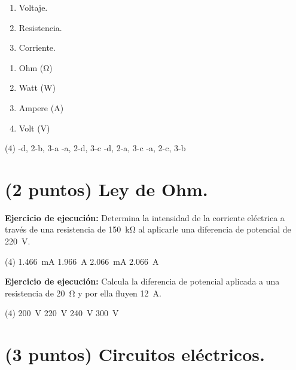 \documentclass[12pt, letter]{exam}
\begin{document}
\begin{questions}
    \begin{minipage}[t]{0.4\linewidth}
        \begin{enumerate}[label=\arabic*)]
            \item Voltaje.
            \item Resistencia.
            \item Corriente.
        \end{enumerate}
    \end{minipage}
    \begin{minipage}[t]{0.4\linewidth}
        \begin{enumerate}[label=\alph*)]
            \item Ohm (\unit{\ohm})
            \item Watt (\unit{\watt})
            \item Ampere (\unit{\ampere})
            \item Volt (\unit{\volt})
        \end{enumerate}
    \end{minipage}
    \begin{tasks}(4)
        -d, 2-b, 3-a
        -a, 2-d, 3-c
        -d, 2-a, 3-c
        -a, 2-c, 3-b
    \end{tasks}

    \section{(2 puntos) Ley de Ohm.}

    \question \label{Ejercicio_10} \label{Problema_02} \textbf{Ejercicio de ejecución: } Determina la intensidad de la corriente eléctrica a través de una resistencia de \SI{150}{\kilo\ohm} al aplicarle una diferencia de potencial de \SI{220}{\volt}.
    \begin{tasks}(4)
        \task \SI{1.466}{\milli\ampere}
        \task \SI{1.966}{\ampere}
        \task \SI{2.066}{\milli\ampere}
        \task \SI{2.066}{\ampere}
    \end{tasks}
    \question \label{Ejercicio_11} \label{Problema_03} \textbf{Ejercicio de ejecución: } Calcula la diferencia de potencial aplicada a una resistencia de \SI{20}{\ohm} y por ella fluyen \SI{12}{\ampere}.
    \begin{tasks}(4)
        \task \SI{200}{\volt}
        \task \SI{220}{\volt}
        \task \SI{240}{\volt}
        \task \SI{300}{\volt}
    \end{tasks}

    \section{(3 puntos) Circuitos eléctricos.}


\end{questions}
\end{document}
